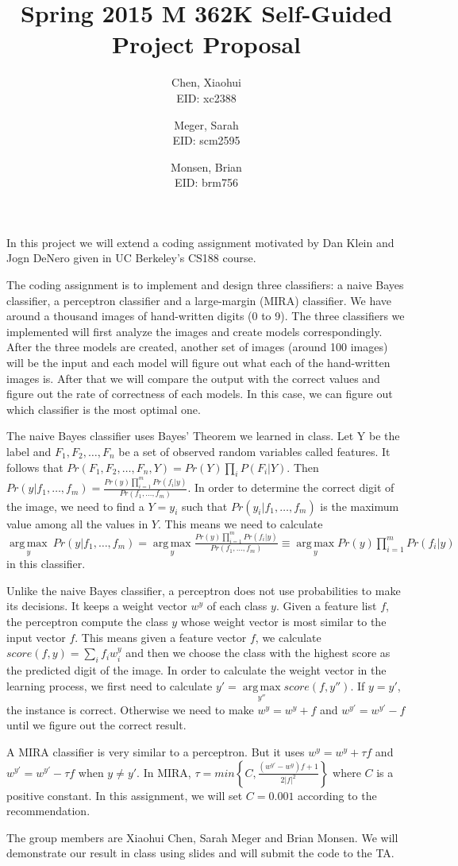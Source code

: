 \documentclass[12pt]{article}
\author{Chen, Xiaohui \\EID: xc2388
\and
Meger, Sarah \\ EID: scm2595
\and
Monsen, Brian \\ EID: brm756}
\title{Spring 2015 M 362K Self-Guided Project Proposal}
\DeclareMathOperator*{\argmax}{arg\,max}
\begin{document}
\maketitle

In this project we will extend a coding assignment motivated by Dan Klein and Jogn DeNero given in UC Berkeley's CS188 course.

The coding assignment is to implement and design three classifiers: a naive Bayes classifier, a perceptron classifier and a large-margin (MIRA) classifier. We have around a thousand images of hand-written digits (0 to 9). The three classifiers we implemented will first analyze the images and create models correspondingly. After the three models are created, another set of images (around 100 images) will be the input and each model will figure out what each of the hand-written images is. After that we will compare the output with the correct values and figure out the rate of correctness of each models. In this case, we can figure out which classifier is the most optimal one.

The naive Bayes classifier uses Bayes' Theorem we learned in class. Let Y be the label and $F_1,F_2,\ldots, F_n$ be a set of observed random variables called features. It follows that $Pr(F_1,F_2,\ldots, F_n,Y)= Pr(Y)\prod\limits_{i} P(F_i|Y)$. Then $Pr(y|f_1,\ldots,f_m)= \frac{Pr(y)\prod_{i=1}^m Pr(f_i|y)}{Pr(f_1,\ldots,f_m)}$. In order to determine the correct digit of the image, we need to find a $Y=y_i$ such that $Pr(y_i|f_1,\ldots,f_m)$ is the maximum value among all the values in $Y$. This means we need to calculate $\argmax \limits_{y}\ Pr(y|f_1,\ldots,f_m)= \argmax \limits_{y} \frac{Pr(y)\prod_{i=1}^m Pr(f_i|y)}{Pr(f_1,\ldots,f_m)} \equiv \argmax \limits_{y} Pr(y)\prod_{i=1}^m Pr(f_i|y)$ in this classifier.

Unlike the naive Bayes classifier, a perceptron does not use probabilities to make its decisions. It keeps a weight vector $w^y$ of each class $y$. Given a feature list $f$, the perceptron compute the class $y$ whose weight vector is most similar to the input vector $f$. This means given a feature vector $f$, we calculate $score(f,y) = \sum \limits_{i} f_i w_i^y$ and then we choose the class with the highest score as the predicted digit of the image. In order to calculate the weight vector in the learning process, we first need to calculate $y'=\argmax \limits_{y''} score(f,y'')$. If $y=y'$, the instance is correct. Otherwise we need to make $w^y=w^y+f$ and $w^{y'}=w^{y'}-f$ until we figure out the correct result.

A MIRA classifier is very similar to a perceptron. But it uses $w^y=w^y+ \tau f$ and $w^{y'}=w^{y'}- \tau f$ when $y\ne y'$. In MIRA, $\tau= min\left\{ C,\frac{(w^{y'}- w^y)f+1}{2|f|^2} \right\}$ where $C$ is a positive constant. In this assignment, we will set $C=0.001$ according to the recommendation.

The group members are Xiaohui Chen, Sarah Meger and Brian Monsen. We will demonstrate our result in class using slides and will submit the code to the TA.
\end{document}
